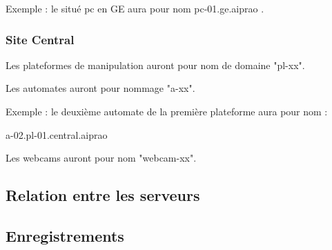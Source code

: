 Exemple : le situé pc en GE aura pour nom pc-01.ge.aiprao .

\subsubsection{Site Central}

Les plateformes de manipulation auront pour nom de domaine "pl-xx".

Les automates auront pour nommage "a-xx". 

Exemple : le deuxième automate de la première plateforme aura pour nom : 

a-02.pl-01.central.aiprao

Les webcams auront pour nom "webcam-xx".

\subsection{Relation entre les serveurs}

\subsection{Enregistrements}
